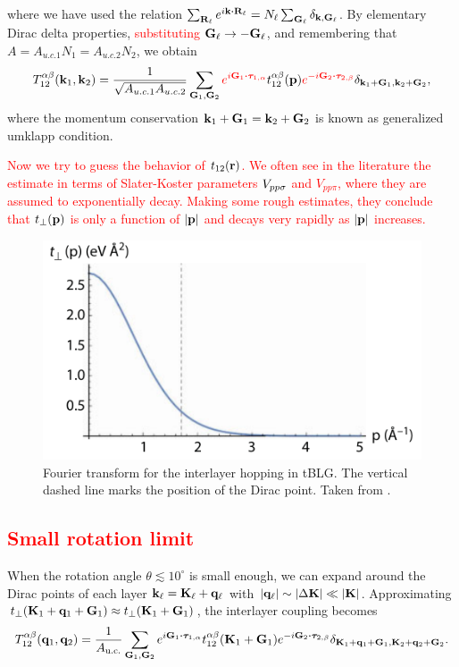 where we have used the relation $\sum_{\R_\ell} e^{i\k\vdot\R_\ell} = N_\ell \sum_{\G_\ell} \delta_{\k,\G_\ell}$. By elementary Dirac delta properties, \textcolor{red}{substituting ${\vb{G}}_\ell \to -{\vb{G}}_\ell$}, and remembering that $A = A_{u.c.1} N_1 = A_{u.c.2} N_2$, we obtain
\begin{equation} \label{eq:interlayer-hopping-simplified}
T_{12}^{\alpha\beta}(\k_1,\k_2) = \frac{1}{\sqrt{A_{u.c.1} A_{u.c.2}}}
\sum_{\G_1, \G_2} \textcolor{red}{e^{i\G_1\vdot\vtau_{1,\alpha}}} t_{12}^{\alpha\beta}(\p)
\textcolor{red}{e^{-i\G_2\vdot\vtau_{2,\beta}}} \delta_{\k_1+\G_1, \k_2+\G_2},
\end{equation}
where the momentum conservation $ {\vb{k}}_1 + {\vb{G}}_1 = {\vb{k}}_2 + {\vb{G}}_2 $ is known as generalized umklapp condition.

\n

\textcolor{red}{
Now we try to guess the behavior of $t_{12}({\vb{r}})$. We often see in the literature the estimate in terms of Slater-Koster parameters $V_{pp\sigma}$ and $V_{pp\pi}$, where they are assumed to exponentially decay. Making some rough estimates, they conclude that $t_\perp({\vb{p}})$ is only a function of $\abs{{\vb{p}}}$ and decays very rapidly as $\abs{{\vb{p}}}$ increases.
}

\begin{figure}[H]
\centering
\includegraphics[width=0.6\linewidth]{fig/tperp.png}
\caption{Fourier transform for the interlayer hopping in tBLG. The vertical dashed line marks the position
of the Dirac point. Taken from \cite{handbook2019}.}
\label{fig:tperp}
\end{figure}

\subsection{\textcolor{red}{Small rotation limit}}

When the rotation angle $\theta \lesssim 10^\circ$ is small enough, we can expand around the Dirac points of each layer ${\vb{k}}_\ell = {\vb{K}}_\ell + {\vb{q}}_\ell$ with $\abs{{\vb{q}}_\ell} \sim \abs{\Delta {\vb{K}}} \ll \abs{{\vb{K}}}$. Approximating $t_\perp({\vb{K}}_1+{\vb{q}}_1+{\vb{G}}_1) \approx t_\perp({\vb{K}}_1+{\vb{G}}_1)$, the interlayer coupling becomes
$$
T_{12}^{\alpha\beta}(\q_1,\q_2) = \frac{1}{A_{\text{u.c.}}} \sum_{\G_1,\G_2} e^{i\G_1\vdot\vtau_{1,\alpha}}
t_{12}^{\alpha\beta}(\K_1+\G_1) e^{-i\G_2\vdot\vtau_{2,\beta}}
\delta_{\K_1+\q_1+\G_1,\K_2+\q_2+\G_2}.
$$

